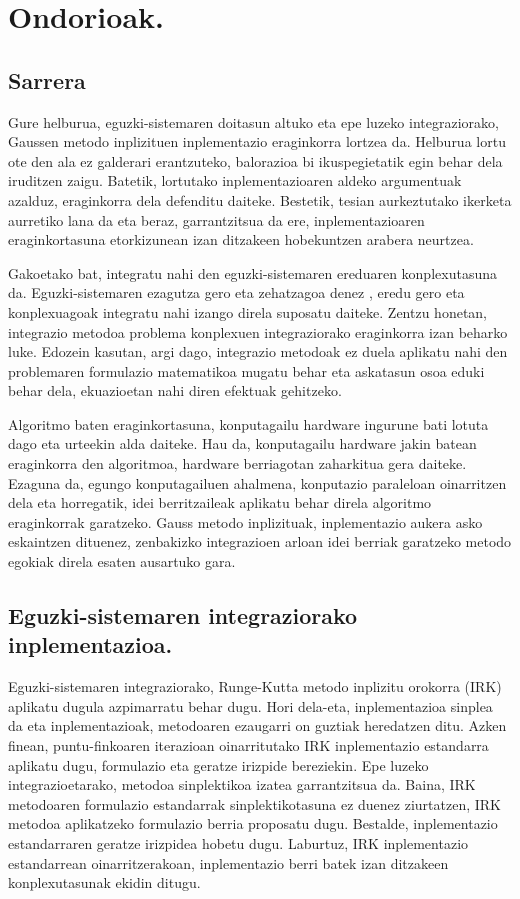 \chapter{Ondorioak.}


\section*{Sarrera}

Gure helburua, eguzki-sistemaren doitasun altuko eta epe luzeko integraziorako, Gaussen metodo inplizituen inplementazio eraginkorra lortzea da. Helburua lortu ote den ala ez galderari erantzuteko, balorazioa bi ikuspegietatik egin behar dela iruditzen zaigu. Batetik, lortutako inplementazioaren aldeko argumentuak azalduz, eraginkorra dela defenditu daiteke. Bestetik, tesian aurkeztutako ikerketa aurretiko lana da eta beraz, garrantzitsua da ere, inplementazioaren eraginkortasuna etorkizunean izan ditzakeen hobekuntzen arabera neurtzea. 

Gakoetako bat, integratu nahi den eguzki-sistemaren ereduaren konplexutasuna da. Eguzki-sistemaren ezagutza gero eta zehatzagoa denez \cite{Kaplan2015}, eredu gero eta konplexuagoak integratu nahi izango direla suposatu daiteke. Zentzu honetan, integrazio metodoa problema konplexuen integraziorako eraginkorra izan beharko luke. Edozein kasutan, argi dago, integrazio metodoak  ez duela aplikatu nahi den problemaren formulazio matematikoa mugatu behar eta askatasun osoa eduki behar dela, ekuazioetan nahi diren efektuak gehitzeko.   

Algoritmo baten eraginkortasuna, konputagailu hardware ingurune bati lotuta dago eta urteekin alda daiteke. Hau da,  konputagailu hardware jakin batean eraginkorra den algoritmoa, hardware berriagotan zaharkitua gera daiteke.  Ezaguna da, egungo konputagailuen ahalmena, konputazio paraleloan oinarritzen dela eta horregatik, idei berritzaileak aplikatu behar direla algoritmo eraginkorrak garatzeko. Gauss metodo inplizituak, inplementazio aukera asko eskaintzen dituenez, zenbakizko integrazioen arloan idei berriak garatzeko metodo egokiak direla \cite{Dongarra2017} esaten ausartuko gara.   


\section*{Eguzki-sistemaren integraziorako inplementazioa.}


Eguzki-sistemaren integraziorako, Runge-Kutta metodo inplizitu orokorra (IRK) aplikatu dugula azpimarratu behar dugu. Hori dela-eta, inplementazioa sinplea da eta inplementazioak, metodoaren ezaugarri on guztiak heredatzen ditu. Azken finean, puntu-finkoaren iterazioan oinarritutako IRK inplementazio estandarra aplikatu dugu, formulazio eta geratze irizpide bereziekin. Epe luzeko integrazioetarako, metodoa sinplektikoa izatea garrantzitsua da. Baina, IRK metodoaren formulazio estandarrak  sinplektikotasuna ez duenez ziurtatzen, IRK metodoa aplikatzeko formulazio berria proposatu dugu. Bestalde, inplementazio estandarraren geratze irizpidea hobetu dugu. Laburtuz, IRK inplementazio estandarrean oinarritzerakoan, inplementazio berri batek izan ditzakeen konplexutasunak ekidin ditugu. 

